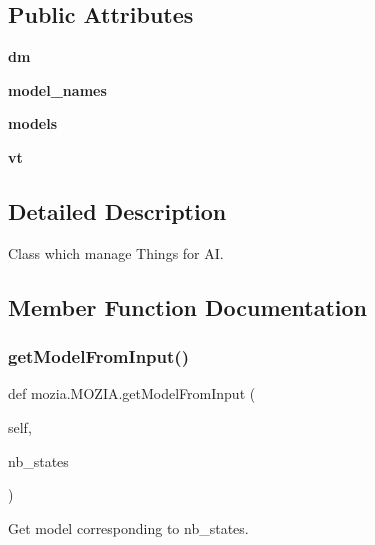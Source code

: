 \subsection*{Public Attributes}
\begin{DoxyCompactItemize}
\item 
\mbox{\label{classmozia_1_1MOZIA_afb17c0868e646cbf295ca50b39259f7f}} 
{\bfseries dm}
\item 
\mbox{\label{classmozia_1_1MOZIA_ad9713da3bec05c81443b2331492a3e0b}} 
{\bfseries model\+\_\+names}
\item 
\mbox{\label{classmozia_1_1MOZIA_a942e3e878dbe20469ae4cf1072a5e043}} 
{\bfseries models}
\item 
\mbox{\label{classmozia_1_1MOZIA_aae190a632feca11fdc6e434025045ff5}} 
{\bfseries vt}
\end{DoxyCompactItemize}


\subsection{Detailed Description}
Class which manage Things for AI. 

\subsection{Member Function Documentation}
\mbox{\label{classmozia_1_1MOZIA_a9e51a2d9116afe84cdafda9edca4960b}} 
\subsubsection{\texorpdfstring{getModelFromInput()}{getModelFromInput()}}
{\footnotesize\ttfamily def mozia.\+M\+O\+Z\+I\+A.\+get\+Model\+From\+Input (\begin{DoxyParamCaption}\item[{}]{self,  }\item[{}]{nb\+\_\+states }\end{DoxyParamCaption})}



Get model corresponding to nb\+\_\+states. 


